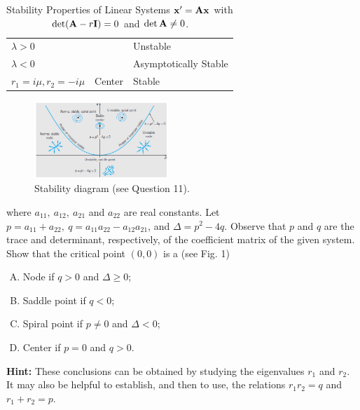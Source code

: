 \documentclass[11pt,a4paper]{article}
\begin{document}
\begin{enumerate}
\begin{table}[H]
\begin{tabular}{ |l|l|l| }
			 $\lambda > 0$ &  & Unstable \\
			 
			 $\lambda < 0$ &  & Asymptotically Stable \\
			 \hline
			 $r_1 = i\mu, r_2 = -i\mu$ & Center & Stable \\
			 \hline
			\end{tabular}
			\caption{ Stability Properties of Linear Systems $\vb{x}^\prime = \vb{Ax}$ with $\det(\vb{A} - r\vb{I}) = 0$ and $\det \vb{A} \neq 0$.}
		\end{table}
		\begin{figure}[H]
			\centering
			\includegraphics[width=0.45\textwidth]{figure/3_fig1.PNG}
			\caption{Stability diagram (see Question 11).}
		\end{figure}
		where $a_{11},\ a_{12},\ a_{21}$ and $a_{22}$ are real constants. Let $p = a_{11} + a_{22},\ q = a_{11}a_{22} - a_{12}a_{21}$, and $\Delta = p^2 - 4q$. Observe that $p$ and $q$ are the trace and determinant, respectively, of the coefficient matrix of the given system. Show that the critical point $(0, 0)$ is a (see Fig. 1)
		\begin{enumerate}[(A)]
			\item Node if $q > 0$ and $\Delta \geq 0$;
			\item Saddle point if $q < 0$;
			\item Spiral point if $p \neq 0$ and $\Delta < 0$;
			\item Center if $p = 0$ and $q > 0$.
		\end{enumerate}
		\textbf{Hint:} These conclusions can be obtained by studying the eigenvalues $r_1$ and $r_2$. It may also be helpful to establish, and then to use, the relations $r_1r_2 = q$ and $r_1 + r_2 = p$.
	\end{enumerate}
\end{document}
